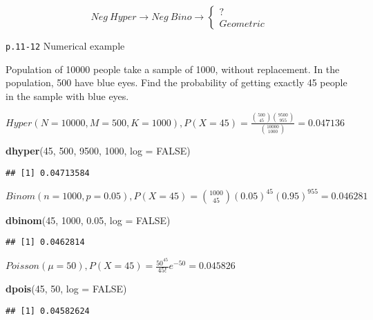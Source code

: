 \documentclass[]{tufte-book}
\newenvironment{Shaded}{}{}
\newcommand{\DataTypeTok}[1]{\textcolor[rgb]{0.56,0.13,0.00}{#1}}
\newcommand{\DecValTok}[1]{\textcolor[rgb]{0.25,0.63,0.44}{#1}}
\newcommand{\FloatTok}[1]{\textcolor[rgb]{0.25,0.63,0.44}{#1}}
\newcommand{\KeywordTok}[1]{\textcolor[rgb]{0.00,0.44,0.13}{\textbf{#1}}}
\newcommand{\NormalTok}[1]{#1}
\newcommand{\OtherTok}[1]{\textcolor[rgb]{0.00,0.44,0.13}{#1}}
\begin{document}
\[Neg\ Hyper \rightarrow Neg\ Bino \rightarrow \begin{cases}?\\Geometric \end{cases}\]

\texttt{p.11-12} Numerical example

Population of 10000 people take a sample of 1000, without replacement.
In the population, 500 have blue eyes. Find the probability of getting
exactly 45 people in the sample with blue eyes.

\(Hyper(N=10000, M=500, K=1000), P(X=45)=\frac{\binom{500}{45}\binom{9500}{955}}{\binom{10000}{1000}}=0.047136\)

\begin{Shaded}
\begin{Highlighting}[]
\KeywordTok{dhyper}\NormalTok{(}\DecValTok{45}\NormalTok{, }\DecValTok{500}\NormalTok{, }\DecValTok{9500}\NormalTok{, }\DecValTok{1000}\NormalTok{, }\DataTypeTok{log =} \OtherTok{FALSE}\NormalTok{)}
\end{Highlighting}
\end{Shaded}

\begin{verbatim}
## [1] 0.04713584
\end{verbatim}

\(Binom(n=1000,p=0.05), P(X=45)=\binom{1000}{45}(0.05)^{45}(0.95)^{955}=0.046281\)

\begin{Shaded}
\begin{Highlighting}[]
\KeywordTok{dbinom}\NormalTok{(}\DecValTok{45}\NormalTok{, }\DecValTok{1000}\NormalTok{, }\FloatTok{0.05}\NormalTok{, }\DataTypeTok{log =} \OtherTok{FALSE}\NormalTok{)}
\end{Highlighting}
\end{Shaded}

\begin{verbatim}
## [1] 0.0462814
\end{verbatim}

\(Poisson(\mu=50), P(X=45)=\frac{50^{45}}{45!}e^{-50}=0.045826\)

\begin{Shaded}
\begin{Highlighting}[]
\KeywordTok{dpois}\NormalTok{(}\DecValTok{45}\NormalTok{, }\DecValTok{50}\NormalTok{, }\DataTypeTok{log =} \OtherTok{FALSE}\NormalTok{)}
\end{Highlighting}
\end{Shaded}

\begin{verbatim}
## [1] 0.04582624
\end{verbatim}
\end{document}
